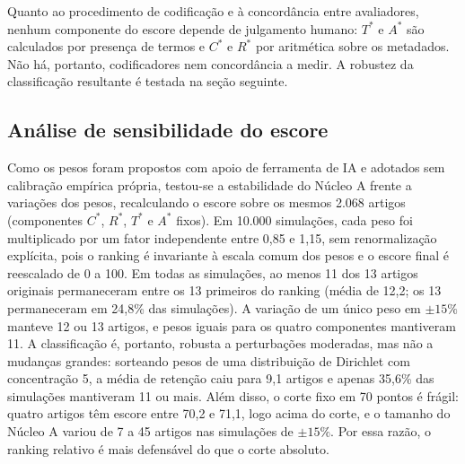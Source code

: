Quanto ao procedimento de codificação e à concordância entre avaliadores, nenhum componente do escore depende de julgamento humano: $T^{*}$ e $A^{*}$ são calculados por presença de termos e $C^{*}$ e $R^{*}$ por aritmética sobre os metadados. Não há, portanto, codificadores nem concordância a medir. A robustez da classificação resultante é testada na seção seguinte.

\subsection{Análise de sensibilidade do escore}
\label{sec:art-sensibilidade}

Como os pesos foram propostos com apoio de ferramenta de IA e adotados sem calibração empírica própria, testou-se a estabilidade do Núcleo A frente a variações dos pesos, recalculando o escore sobre os mesmos 2.068 artigos (componentes $C^*$, $R^*$, $T^*$ e $A^*$ fixos). Em 10.000 simulações, cada peso foi multiplicado por um fator independente entre 0,85 e 1,15, sem renormalização explícita, pois o ranking é invariante à escala comum dos pesos e o escore final é reescalado de 0 a 100. Em todas as simulações, ao menos 11 dos 13 artigos originais permaneceram entre os 13 primeiros do ranking (média de 12,2; os 13 permaneceram em 24,8\% das simulações). A variação de um único peso em $\pm 15\%$ manteve 12 ou 13 artigos, e pesos iguais para os quatro componentes mantiveram 11. A classificação é, portanto, robusta a perturbações moderadas, mas não a mudanças grandes: sorteando pesos de uma distribuição de Dirichlet com concentração 5, a média de retenção caiu para 9,1 artigos e apenas 35,6\% das simulações mantiveram 11 ou mais. Além disso, o corte fixo em 70 pontos é frágil: quatro artigos têm escore entre 70,2 e 71,1, logo acima do corte, e o tamanho do Núcleo A variou de 7 a 45 artigos nas simulações de $\pm 15\%$. Por essa razão, o ranking relativo é mais defensável do que o corte absoluto.

